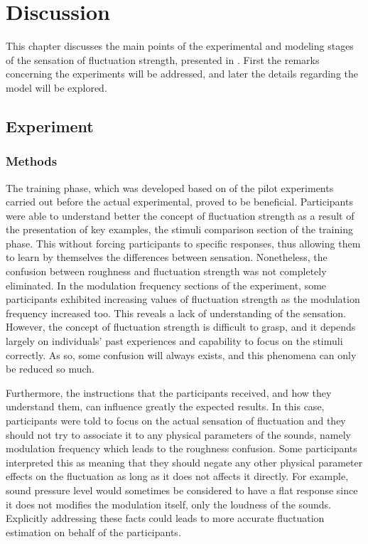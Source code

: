 \documentclass[../main.tex]{subfiles}
\begin{document}
\chapter{Discussion}
\label{cha:discussion}

This chapter discusses the main points of the experimental and modeling stages
of the sensation of fluctuation strength, presented in
. First the remarks concerning the experiments
will be addressed, and later the details regarding the model will be explored.

\section{Experiment}

\subsection{Methods}

The training phase, which was developed based on of the pilot experiments carried
out before the actual experimental, proved to be beneficial. Participants were
able to understand better the concept of fluctuation strength as a result of the
presentation of key examples, the stimuli comparison section of the training
phase. This without forcing participants to specific responses, thus allowing
them to learn by themselves the differences between sensation. Nonetheless, the
confusion between roughness and fluctuation strength was not completely
eliminated. In the modulation frequency sections of the experiment, some
participants exhibited increasing values of fluctuation strength as the
modulation frequency increased too. This reveals a lack of understanding of the
sensation. However, the concept of fluctuation strength is difficult to grasp,
and it depends largely on individuals' past experiences and capability to focus
on the stimuli correctly. As so, some confusion will always exists, and this
phenomena can only be reduced so much.

Furthermore, the instructions that the participants received, and how they
understand them, can influence greatly the expected results. In this case,
participants were told to focus on the actual sensation of fluctuation and they
should not try to associate it to any physical parameters of the sounds, namely
modulation frequency which leads to the roughness confusion. Some participants
interpreted this as meaning that they should negate any other physical parameter
effects on the fluctuation as long as it does not affects it directly. For
example, sound pressure level would sometimes be considered to have a flat
response since it does not modifies the modulation itself, only the loudness of
the sounds. Explicitly addressing these facts could leads to more accurate
fluctuation estimation on behalf of the participants.
\end{document}
